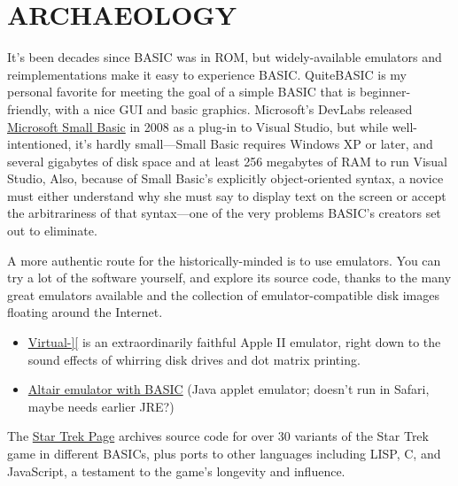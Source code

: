 
\section{ARCHAEOLOGY}


It's been decades since BASIC was in ROM, but widely-available emulators
and reimplementations make it easy to experience BASIC.
QuiteBASIC is my personal favorite for meeting the goal of a simple
BASIC that is beginner-friendly, with a nice GUI and basic graphics.
Microsoft's DevLabs released \href{http://smallbasic.com}{Microsoft
Small Basic} in 2008 as a plug-in to Visual Studio, but while
well-intentioned, it's hardly small---Small Basic requires Windows XP or
later, and several gigabytes of disk space and at least 256 megabytes of
RAM to run Visual Studio,
Also, because of Small Basic's explicitly object-oriented syntax, a
novice must either understand why she must say
 to display text on the screen or
accept the arbitrariness of that syntax---one of the very problems
BASIC's creators set out to eliminate.

A more authentic route for the historically-minded is to use emulators.
You can try a lot of the software yourself, and explore
its source code, thanks to the many great emulators available and the
collection of emulator-compatible disk images floating around the Internet.

\begin{itemize}

\item \href{http://virtualii.com}{Virtual-][} is an extraordinarily
  faithful Apple II emulator, right down to the sound effects of
  whirring disk drives and dot matrix printing.

\item \href{http://web.archive.org/web/20011211231432/http://www.rjh.org.uk/altair/4k/em/altem.htm}{Altair emulator with BASIC} (Java applet emulator; doesn't run in Safari,
maybe needs earlier JRE?)

\end{itemize}


The
\href{http://web.archive.org/web/20081209035052/http://www.dunnington.u-net.com/public/startrek/}{Star
  Trek Page} archives source code for over 30 variants of the Star Trek
game in different BASICs, plus ports to other languages including LISP, C, and
JavaScript, a testament to the game's longevity and influence.

